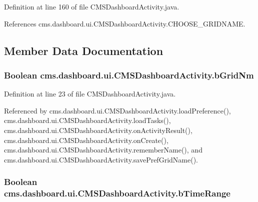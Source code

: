 \-Definition at line 160 of file \-C\-M\-S\-Dashboard\-Activity.\-java.



\-References cms.\-dashboard.\-ui.\-C\-M\-S\-Dashboard\-Activity.\-C\-H\-O\-O\-S\-E\-\_\-\-G\-R\-I\-D\-N\-A\-M\-E.



\subsection{\-Member \-Data \-Documentation}
\subsubsection[{b\-Grid\-Nm}]{\setlength{\rightskip}{0pt plus 5cm}\-Boolean {\bf cms.\-dashboard.\-ui.\-C\-M\-S\-Dashboard\-Activity.\-b\-Grid\-Nm}\hspace{0.3cm}{\ttfamily  [private]}}\label{classcms_1_1dashboard_1_1ui_1_1_c_m_s_dashboard_activity_aacb11e652fcca1dc5a384685c25419e5}


\-Definition at line 23 of file \-C\-M\-S\-Dashboard\-Activity.\-java.



\-Referenced by cms.\-dashboard.\-ui.\-C\-M\-S\-Dashboard\-Activity.\-load\-Preference(), cms.\-dashboard.\-ui.\-C\-M\-S\-Dashboard\-Activity.\-load\-Tasks(), cms.\-dashboard.\-ui.\-C\-M\-S\-Dashboard\-Activity.\-on\-Activity\-Result(), cms.\-dashboard.\-ui.\-C\-M\-S\-Dashboard\-Activity.\-on\-Create(), cms.\-dashboard.\-ui.\-C\-M\-S\-Dashboard\-Activity.\-remember\-Name(), and cms.\-dashboard.\-ui.\-C\-M\-S\-Dashboard\-Activity.\-save\-Pref\-Grid\-Name().

\subsubsection[{b\-Time\-Range}]{\setlength{\rightskip}{0pt plus 5cm}\-Boolean {\bf cms.\-dashboard.\-ui.\-C\-M\-S\-Dashboard\-Activity.\-b\-Time\-Range}\hspace{0.3cm}{\ttfamily  [package]}}\label{classcms_1_1dashboard_1_1ui_1_1_c_m_s_dashboard_activity_a37ccf1be7d57ffc94a3c8fdc5f79d05c}



